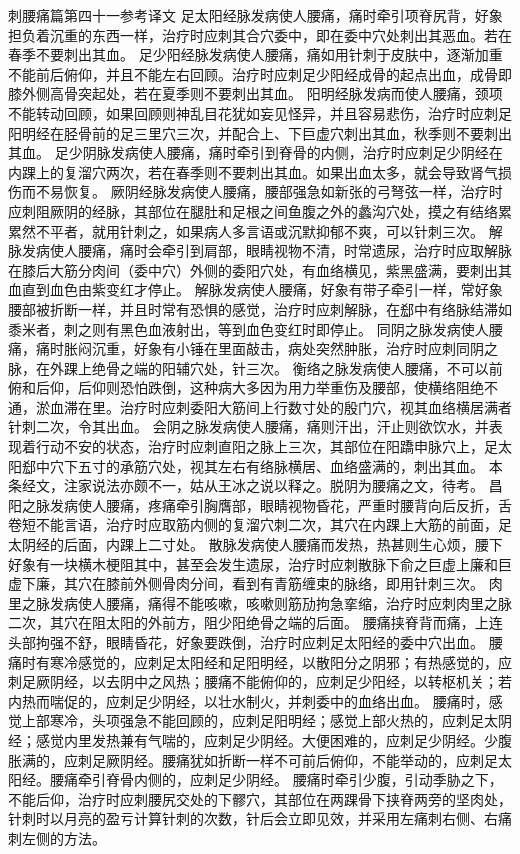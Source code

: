 \documentclass[a4paper,12pt,UTF8,twoside]{ctexbook}
\begin{document}
刺腰痛篇第四十一参考译文
足太阳经脉发病使人腰痛，痛时牵引项脊尻背，好象担负着沉重的东西一样，治疗时应刺其合穴委中，即在委中穴处刺出其恶血。若在春季不要刺出其血。
足少阳经脉发病使人腰痛，痛如用针刺于皮肤中，逐渐加重不能前后俯仰，并且不能左右回顾。治疗时应刺足少阳经成骨的起点出血，成骨即膝外侧高骨突起处，若在夏季则不要刺出其血。
阳明经脉发病而使人腰痛，颈项不能转动回顾，如果回顾则神乱目花犹如妄见怪异，并且容易悲伤，治疗时应刺足阳明经在胫骨前的足三里穴三次，并配合上、下巨虚穴刺出其血，秋季则不要刺出其血。
足少阴脉发病使人腰痛，痛时牵引到脊骨的内侧，治疗时应刺足少阴经在内踝上的复溜穴两次，若在春季则不要刺出其血。如果出血太多，就会导致肾气损伤而不易恢复。
厥阴经脉发病使人腰痛，腰部强急如新张的弓弩弦一样，治疗时应刺阻厥阴的经脉，其部位在腿肚和足根之间鱼腹之外的蠡沟穴处，摸之有结络累累然不平者，就用针刺之，如果病人多言语或沉默抑郁不爽，可以针刺三次。
解脉发病使人腰痛，痛时会牵引到肩部，眼睛视物不清，时常遗尿，治疗时应取解脉在膝后大筋分肉间（委中穴）外侧的委阳穴处，有血络横见，紫黑盛满，要刺出其血直到血色由紫变红才停止。
解脉发病使人腰痛，好象有带子牵引一样，常好象腰部被折断一样，并且时常有恐惧的感觉，治疗时应刺解脉，在郄中有络脉结滞如黍米者，刺之则有黑色血液射出，等到血色变红时即停止。
同阴之脉发病使人腰痛，痛时胀闷沉重，好象有小锤在里面敲击，病处突然肿胀，治疗时应刺同阴之脉，在外踝上绝骨之端的阳辅穴处，针三次。
衡络之脉发病使人腰痛，不可以前俯和后仰，后仰则恐怕跌倒，这种病大多因为用力举重伤及腰部，使横络阻绝不通，淤血滞在里。治疗时应刺委阳大筋间上行数寸处的殷门穴，视其血络横居满者针刺二次，令其出血。
会阴之脉发病使人腰痛，痛则汗出，汗止则欲饮水，并表现着行动不安的状态，治疗时应刺直阳之脉上三次，其部位在阳蹻申脉穴上，足太阳郄中穴下五寸的承筋穴处，视其左右有络脉横居、血络盛满的，刺出其血。
本条经文，注家说法亦颇不一，姑从王冰之说以释之。脱阴为腰痛之文，待考。
昌阳之脉发病使人腰痛，疼痛牵引胸膺部，眼睛视物昏花，严重时腰背向后反折，舌卷短不能言语，治疗时应取筋内侧的复溜穴刺二次，其穴在内踝上大筋的前面，足太阴经的后面，内踝上二寸处。
散脉发病使人腰痛而发热，热甚则生心烦，腰下好象有一块横木梗阻其中，甚至会发生遗尿，治疗时应刺散脉下俞之巨虚上廉和巨虚下廉，其穴在膝前外侧骨肉分间，看到有青筋缠束的脉络，即用针刺三次。
肉里之脉发病使人腰痛，痛得不能咳嗽，咳嗽则筋劢拘急挛缩，治疗时应刺肉里之脉二次，其穴在阻太阳的外前方，阻少阳绝骨之端的后面。
腰痛挟脊背而痛，上连头部拘强不舒，眼睛昏花，好象要跌倒，治疗时应刺足太阳经的委中穴出血。
腰痛时有寒冷感觉的，应刺足太阳经和足阳明经，以散阳分之阴邪；有热感觉的，应刺足厥阴经，以去阴中之风热；腰痛不能俯仰的，应刺足少阳经，以转枢机关；若内热而喘促的，应刺足少阴经，以壮水制火，并刺委中的血络出血。
腰痛时，感觉上部寒冷，头项强急不能回顾的，应刺足阳明经；感觉上部火热的，应刺足太阴经；感觉内里发热兼有气喘的，应刺足少阴经。大便困难的，应刺足少阴经。少腹胀满的，应刺足厥阴经。腰痛犹如折断一样不可前后俯仰，不能举动的，应刺足太阳经。腰痛牵引脊骨内侧的，应刺足少阴经。
腰痛时牵引少腹，引动季胁之下，不能后仰，治疗时应刺腰尻交处的下髎穴，其部位在两踝骨下挟脊两旁的坚肉处，针刺时以月亮的盈亏计算针刺的次数，针后会立即见效，并采用左痛刺右侧、右痛刺左侧的方法。
\end{document}
